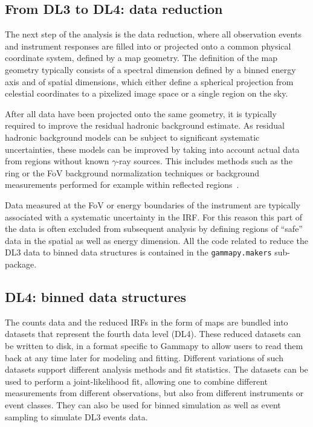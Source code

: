 \documentclass[longauth]{aa}
\newcommand{\code}[1]{\texttt{#1}}
\newcommand{\gammapy}{Gammapy\xspace}
\newcommand{\gammaray}{$\gamma$-ray\xspace}
\begin{document}
\subsection{From DL3 to DL4: data reduction}
The next step of the analysis is the data reduction, where all observation events and instrument
responses are filled into or projected onto a common physical coordinate system, defined by
a map geometry. The definition of the map geometry typically consists of a spectral dimension
defined by a binned energy axis and of spatial dimensions, which either define 
a spherical projection from celestial coordinates to a pixelized image space
or a single region on the sky.

After all data have been projected onto the same geometry, it is typically
required to improve the residual hadronic background estimate. As residual hadronic
background models can be subject to significant systematic uncertainties,
these models can be improved by taking into account actual data
from regions without known \gammaray sources. This includes methods 
such as the ring or the FoV background normalization techniques or background measurements
performed for example within reflected regions~\citep{Berge07}.


Data measured at the FoV or energy boundaries of the instrument are typically
associated with a systematic uncertainty in the IRF. For this reason this part 
of the data is often excluded from subsequent analysis by defining regions of
\enquote{safe} data in the spatial as well as energy dimension. All the code
related to reduce the DL3 data to binned data structures is contained in the
\code{gammapy.makers} sub-package.


\subsection{DL4: binned data structures}
The counts data and the reduced IRFs in the form of maps are bundled into datasets
that represent the fourth data level (DL4). These reduced datasets can be written to disk,
in a format specific to \gammapy to allow users to read them back at any time later
for modeling and fitting. Different variations of such datasets support different 
analysis methods and fit statistics. The datasets can be used to perform a joint-likelihood
fit, allowing one to combine different measurements from different observations,
but also from different instruments or event classes. They can also be used for binned
simulation as well as event sampling to simulate DL3 events data.
\end{document}
